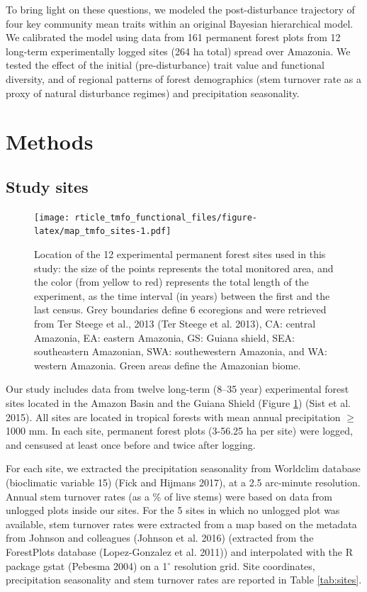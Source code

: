 \documentclass[]{elsarticle} %
\begin{document}
To bring light on these questions, we modeled the post-disturbance
trajectory of four key community mean traits within an original Bayesian
hierarchical model. We calibrated the model using data from 161
permanent forest plots from 12 long-term experimentally logged sites
(264 ha total) spread over Amazonia. We tested the effect of the initial
(pre-disturbance) trait value and functional diversity, and of regional
patterns of forest demographics (stem turnover rate as a proxy of
natural disturbance regimes) and precipitation seasonality.

\section{Methods}\label{methods}

\subsection{Study sites}\label{study-sites}

\begin{figure}
\centering
\texttt{[image: rticle\_tmfo\_functional\_files/figure-latex/map\_tmfo\_sites-1.pdf]}
\caption{\label{fig:map_tmfo}Location of the 12 experimental permanent
forest sites used in this study: the size of the points represents the
total monitored area, and the color (from yellow to red) represents the
total length of the experiment, as the time interval (in years) between
the first and the last census. Grey boundaries define 6 ecoregions and
were retrieved from Ter Steege et al., 2013 (Ter Steege et al. 2013),
CA: central Amazonia, EA: eastern Amazonia, GS: Guiana shield, SEA:
southeastern Amazonian, SWA: southewestern Amazonia, and WA: western
Amazonia. Green areas define the Amazonian biome.}
\end{figure}

Our study includes data from twelve long-term (8--35 year) experimental
forest sites located in the Amazon Basin and the Guiana Shield (Figure
\ref{fig:map_tmfo}) (Sist et al. 2015). All sites are located in
tropical forests with mean annual precipitation \(\geq\) 1000 mm. In
each site, permanent forest plots (3-56.25 ha per site) were logged, and
censused at least once before and twice after logging.

For each site, we extracted the precipitation seasonality from Worldclim
database (bioclimatic variable 15) (Fick and Hijmans 2017), at a 2.5
arc-minute resolution. Annual stem turnover rates (as a \% of live
stems) were based on data from unlogged plots inside our sites. For the
5 sites in which no unlogged plot was available, stem turnover rates
were extracted from a map based on the metadata from Johnson and
colleagues (Johnson et al. 2016) (extracted from the ForestPlots
database (Lopez-Gonzalez et al. 2011)) and interpolated with the R
package gstat (Pebesma 2004) on a 1\(^\circ\) resolution grid. Site
coordinates, precipitation seasonality and stem turnover rates are
reported in Table \ref{tab:sites}.
\end{document}
